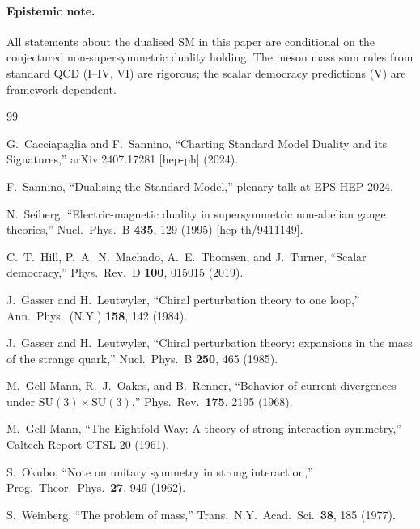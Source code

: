 \documentclass[11pt,a4paper]{article}
\theoremstyle{plain}
\begin{document}
\paragraph{Epistemic note.}
All statements about the dualised SM in this paper are conditional on
the conjectured non-supersymmetric duality holding.  The meson mass sum
rules from standard QCD (I--IV, VI) are rigorous; the scalar democracy
predictions (V) are framework-dependent.


\begin{thebibliography}{99}

  G.~Cacciapaglia and F.~Sannino,
  ``Charting Standard Model Duality and its Signatures,''
  arXiv:2407.17281 [hep-ph] (2024).

  F.~Sannino,
  ``Dualising the Standard Model,''
  plenary talk at EPS-HEP 2024.

  N.~Seiberg,
  ``Electric-magnetic duality in supersymmetric non-abelian gauge theories,''
  Nucl.\ Phys.\ B \textbf{435}, 129 (1995)
  [hep-th/9411149].

  C.~T.~Hill, P.~A.~N.~Machado, A.~E.~Thomsen, and J.~Turner,
  ``Scalar democracy,''
  Phys.\ Rev.\ D \textbf{100}, 015015 (2019).

  J.~Gasser and H.~Leutwyler,
  ``Chiral perturbation theory to one loop,''
  Ann.\ Phys.\ (N.Y.) \textbf{158}, 142 (1984).

  J.~Gasser and H.~Leutwyler,
  ``Chiral perturbation theory: expansions in the mass of the strange quark,''
  Nucl.\ Phys.\ B \textbf{250}, 465 (1985).

  M.~Gell-Mann, R.~J.~Oakes, and B.~Renner,
  ``Behavior of current divergences under $\mathrm{SU}(3) \times \mathrm{SU}(3)$,''
  Phys.\ Rev.\ \textbf{175}, 2195 (1968).

  M.~Gell-Mann,
  ``The Eightfold Way: A theory of strong interaction symmetry,''
  Caltech Report CTSL-20 (1961).

  S.~Okubo,
  ``Note on unitary symmetry in strong interaction,''
  Prog.\ Theor.\ Phys.\ \textbf{27}, 949 (1962).

  S.~Weinberg,
  ``The problem of mass,''
  Trans.\ N.Y.\ Acad.\ Sci.\ \textbf{38}, 185 (1977).


\end{thebibliography}
\end{document}
